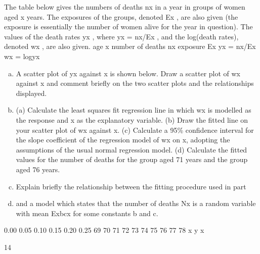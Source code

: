 \documentclass[a4paper,12pt]{article}
\begin{document}
\item The table below gives the numbers of deaths nx in a year in groups of women aged x
years. The exposures of the groups, denoted Ex , are also given (the exposure is
essentially the number of women alive for the year in question). The values of the
death rates yx , where yx = nx/Ex , and the log(death rates), denoted wx , are also given.
age x number of deaths nx exposure Ex yx = nx/Ex wx = logyx
\begin{enumerate}[(a)]
\item A scatter plot of yx against x is shown below.
Draw a scatter plot of wx against x and comment briefly on the two scatter
plots and the relationships displayed. 
\item (a) Calculate the least squares fit regression line in which wx is modelled
as the response and x as the explanatory variable.
(b) Draw the fitted line on your scatter plot of wx against x.
(c) Calculate a 95\% confidence interval for the slope coefficient of the
regression model of wx on x, adopting the assumptions of the usual
normal regression model.
(d) Calculate the fitted values for the number of deaths for the group aged
71 years and the group aged 76 years. 
\item Explain briefly the relationship between the fitting procedure used in part \item
and a model which states that the number of deaths Nx is a random variable
with mean Exbcx for some constants b and c. 
\end{enumerate}
0.00
0.05
0.10
0.15
0.20
0.25
69 70 71 72 73 74 75 76 77 78
x
y x


14 
\end{document}
